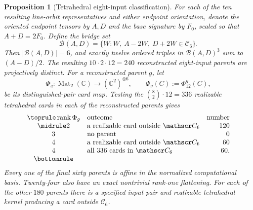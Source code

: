 \documentclass[11pt,letterpaper,onecolumn]{article}
\theoremstyle{plain}
\newtheorem{proposition}[proposition]{Proposition}
\theoremstyle{definition}
\theoremstyle{remark}
\newcommand{\Mat}{\operatorname{Mat}}
\newcommand{\rank}{\operatorname{rank}}
\begin{document}
\begin{proposition}[Tetrahedral eight-input classification]
For each of the ten resulting line-orbit representatives and either endpoint
orientation, denote the oriented endpoint tensors by \(A,D\) and the base signature by \(F_0\), scaled so that \(A+D=2F_0\). Define the bridge set
\begin{equation}
 \mathcal B(A,D)=
 \{W:W,\ A-2W,\ D+2W\in\mathscr C_6\}.
 \label{eq:cert-A4-b8-bridge}
\end{equation}
Then \(|\mathcal B(A,D)|=6\), and exactly twelve ordered triples in
\(\mathcal B(A,D)^3\) sum to \((A-D)/2\).  The resulting
\(10\cdot2\cdot12=240\) reconstructed eight-input parents are projectively
distinct.  For a reconstructed parent \(g\), let
\[
  \Phi_g:\Mat_2(\mathbb C)\longrightarrow
       (\mathbb C^2)^{\otimes6},\qquad
  \Phi_g(C):=\Phi_{12}^g(C),
\]
be its distinguished-pair card map.  Testing the
\(\binom82\cdot12=336\) realizable tetrahedral cards in
each of the reconstructed parents gives
\begin{equation*}
\begin{array}{clr}
\toprule
\rank\Phi_g&\text{outcome}&\text{number}\\ \midrule
2&\text{a realizable card outside }\mathscr C_6&120\\
3&\text{no parent}&0\\
4&\text{a realizable card outside }\mathscr C_6&60\\
4&\text{all }336\text{ cards in }\mathscr C_6&60.\\
\bottomrule
\end{array}
\end{equation*}
Every one of the final sixty parents is affine in the normalized
computational basis. Twenty-four also have an exact nontrivial rank-one
flattening.  For each of the other \(180\) parents there is a specified input pair
and realizable tetrahedral kernel producing a card outside \(\mathscr C_6\).
\end{proposition}
\end{document}
